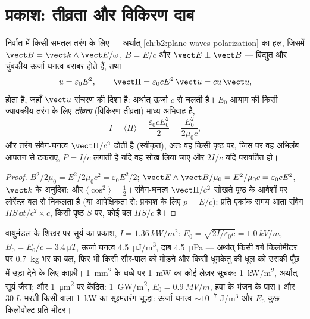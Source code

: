 \section{प्रकाश: तीव्रता और विकिरण दाब}

\begin{proposition}[किसी समतल तरंग की ऊर्जा]\label{prop:b2:poynting-vector:wave}
निर्वात में किसी समतल तरंग के लिए --- अर्थात् \cref{ch:b2:plane-waves-polarization} का हल,
जिसमें $\vect B = \vect k\wedge\vect E/\omega$, $B = E/c$ और $\vect E \perp \vect B$ ---
विद्युत और चुंबकीय ऊर्जा-घनत्व बराबर होते हैं, तथा
\[
u = \varepsilon_0E^2 , \qquad \vect\Pi = \varepsilon_0cE^2\,\vect u = cu\,\vect u ,
\]
होता है, जहाँ $\vect u$ संचरण की दिशा है: अर्थात् ऊर्जा $c$ से चलती है।
$E_0$ आयाम की किसी ज्यावक्रीय तरंग के लिए \emph{तीव्रता}
(विकिरण-तीव्रता) माध्य अभिवाह है,
\[
I = \langle\Pi\rangle = \frac{\varepsilon_0cE_0^2}2 = \frac{E_0^2}{2\mu_0c} ,
\]
और तरंग संवेग-घनत्व $\vect\Pi/c^2$ ढोती है (स्वीकृत), अतः
वह किसी पृष्ठ पर, जिस पर वह अभिलंब आपतन से टकराए,
\emph{} $P = I/c$ लगाती है यदि वह सोख लिया जाए और $2I/c$ यदि परावर्तित हो।
\end{proposition}

\begin{proof}
$B^2/2\mu_0 = E^2/2\mu_0c^2 = \varepsilon_0E^2/2$; $\vect E\wedge\vect B/\mu_0 = E^2/\mu_0c =
\varepsilon_0cE^2$, $\vect k$ के अनुदिश; और $\langle\cos^2\rangle = \tfrac12$। संवेग-घनत्व
$\vect\Pi/c^2$ सोखते पृष्ठ के आवेशों पर लोरेंत्ज़ बल से निकलता है
(या आपेक्षिकता से: प्रकाश के लिए $p = E/c$): प्रति एकांक समय आता संवेग
$\Pi S\,\dd t/c^2\times c$, किसी पृष्ठ $S$ पर, कोई
बल $\Pi S/c$ है।
\end{proof}

\begin{example}[सूर्य का प्रकाश, लेज़र, सूक्ष्मतरंग]\label{ex:b2:poynting-vector:orders}
वायुमंडल के शिखर पर सूर्य का प्रकाश, $I = \qty{1.36}{kW/m^2}$: $E_0 =
\sqrt{2I/\varepsilon_0c} = \qty{1.0}{kV/m}$, $B_0 = E_0/c = \qty{3.4}{\micro T}$, ऊर्जा
घनत्व \qty{4.5}{\micro J/m^3}, दाब \qty{4.5}{\micro Pa} --- अर्थात् किसी वर्ग किलोमीटर पर
\qty{0.7}{kg} भर का बल, फिर भी किसी सौर-पाल को मोड़ने और किसी धूमकेतु की धूल को
उसकी पूँछ में उड़ा देने के लिए काफ़ी। \qty{1}{mm^2} के धब्बे पर \qty{1}{mW} का कोई
लेज़र सूचक: \qty{1}{kW/m^2}, अर्थात् सूर्य जैसा; और \qty{1}{\micro m^2} पर केंद्रित:
\qty{1}{GW/m^2}, $E_0 = \qty{0.9}{MV/m}$, हवा के भंजन के पास। और
$\qty{30}{L}$ भरती किसी  वाला \qty{1}{kW} का सूक्ष्मतरंग-चूल्हा: ऊर्जा
घनत्व $\sim 10^{-7}$ J/m$^3$ और $E_0$ कुछ किलोवोल्ट प्रति मीटर।
\end{example}

